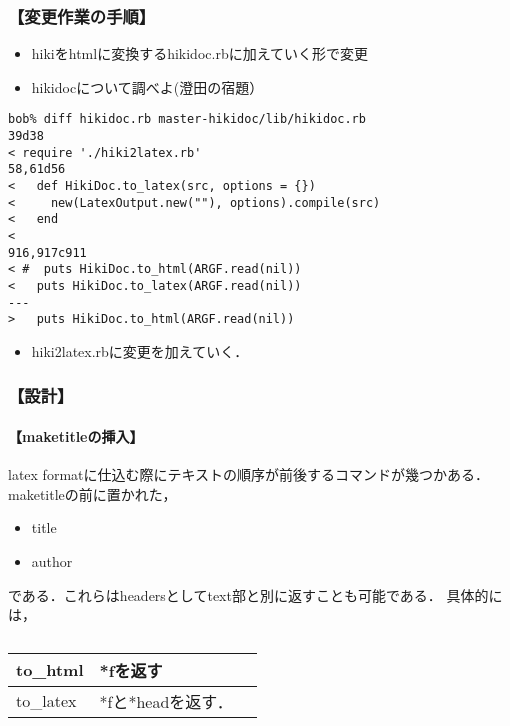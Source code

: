 
\subsubsection{【変更作業の手順】}\begin{itemize}
\item hikiをhtmlに変換するhikidoc.rbに加えていく形で変更
\item hikidocについて調べよ(澄田の宿題）
\end{itemize}\begin{lstlisting}[style=customRuby]
bob% diff hikidoc.rb master-hikidoc/lib/hikidoc.rb 
39d38
< require './hiki2latex.rb'
58,61d56
<   def HikiDoc.to_latex(src, options = {})
<     new(LatexOutput.new(""), options).compile(src)
<   end
< 
916,917c911
< #  puts HikiDoc.to_html(ARGF.read(nil))
<   puts HikiDoc.to_latex(ARGF.read(nil))
---
>   puts HikiDoc.to_html(ARGF.read(nil))
\end{lstlisting}\begin{itemize}
\item hiki2latex.rbに変更を加えていく．
\end{itemize}
\subsubsection{【設計】}
\paragraph{【maketitleの挿入】}
latex formatに仕込む際にテキストの順序が前後するコマンドが幾つかある．
\\maketitleの前に置かれた，
\begin{itemize}
\item title
\item author
\end{itemize}
である．これらはheadersとしてtext部と別に返すことも可能である．
具体的には，

\begin{table}[htbp]\begin{center}
\caption{}
\begin{tabular}{lll}
\hline
to\_html   &*fを返す  \\ \hline
to\_latex   &*fと*headを返す．  \\
\hline
\end{tabular}
\label{default}
\end{center}\end{table}

